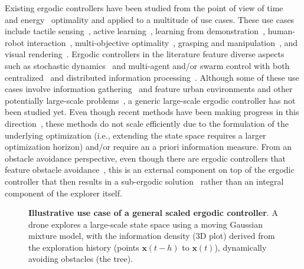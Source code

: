 \documentclass[letterpaper,10pt,conference,twoside]{IEEEtran}
\theoremstyle{definition}
\begin{document}
Existing ergodic controllers have been studied from the point of view of time~\cite{dong2023time} and energy~\cite{seewald2024energy,naveed2024eclares} optimality and applied to a multitude of use cases. These use cases include tactile sensing~\cite{abraham2017ergodic}, active learning~\cite{abraham2021ergodic}, learning from demonstration~\cite{kalinowska2021learning}, human-robot interaction~\cite{fitzsimons2019ergodicity,fitzsimons2022ergodic}, multi-objective optimality~\cite{ren2023pareto,srinivasan2023multi}, grasping and manipulation~\cite{shetty2022ergodic,bilaloglu2023whole}, and visual rendering~\cite{low2022drozbot,prabhakar2020autonomous}. Ergodic controllers in the literature feature diverse aspects such as stochastic dynamics~\cite{torre2016ergodic,ayvali2017ergodic} and multi-agent and/or swarm control with both centralized~\cite{seewald2024energy,rao2024learning} and distributed information processing~\cite{prabhakar2020ergodic,coffin2022multi}. Although some of these use cases involve information gathering~\cite{dressel2018optimality} and feature urban environments and other potentially large-scale problems~\cite{prabhakar2020ergodic,rao2023multi}, a generic large-scale ergodic controller has not been studied yet. Even though recent methods have been making progress in this direction~\cite{whittemeyer2023bi,seewald2024energy,naveed2024eclares,dong2023time}, these methods do not scale efficiently due to the formulation of the underlying optimization (i.e., extending the state space requires a larger optimization horizon) and/or require an a priori information measure. From an obstacle avoidance perspective, even though there are ergodic controllers that feature obstacle avoidance~\cite{lerch2023safety,prabhakar2020ergodic}, this is an external component on top of the ergodic controller that then results in a sub-ergodic solution~\cite{dong2023time} rather than an integral component of the explorer itself.

\begin{figure}
  \centering
  
  \caption{\textbf{Illustrative use case of a general scaled ergodic controller}. A drone explores a large-scale state space using a moving Gaussian mixture model, with the information density (3D plot) derived from the exploration history (points $\mathbf{x}(t-h)$ to $\mathbf{x}(t)$), dynamically avoiding obstacles (the tree).}
  \label{fig:-1}
  \vspace*{-.1cm}
\end{figure}
\end{document}
